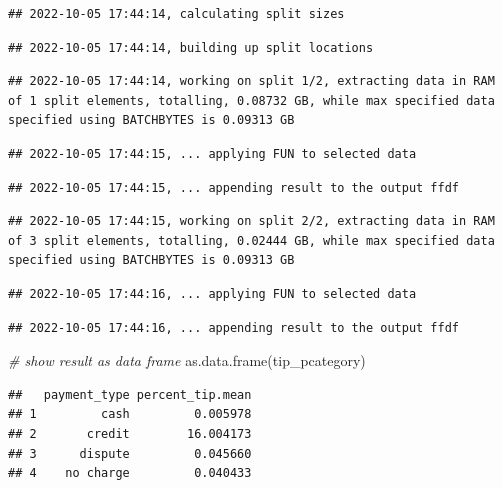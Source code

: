 \documentclass[
  12pt,
]{style/krantz}
\newenvironment{Shaded}{\begin{snugshade}}{\end{snugshade}}
\newcommand{\CommentTok}[1]{\textcolor[rgb]{0.56,0.35,0.01}{\textit{#1}}}
\newcommand{\FunctionTok}[1]{\textcolor[rgb]{0.00,0.00,0.00}{#1}}
\newcommand{\NormalTok}[1]{#1}
\begin{document}
\begin{verbatim}
## 2022-10-05 17:44:14, calculating split sizes
\end{verbatim}

\begin{verbatim}
## 2022-10-05 17:44:14, building up split locations
\end{verbatim}

\begin{verbatim}
## 2022-10-05 17:44:14, working on split 1/2, extracting data in RAM of 1 split elements, totalling, 0.08732 GB, while max specified data specified using BATCHBYTES is 0.09313 GB
\end{verbatim}

\begin{verbatim}
## 2022-10-05 17:44:15, ... applying FUN to selected data
\end{verbatim}

\begin{verbatim}
## 2022-10-05 17:44:15, ... appending result to the output ffdf
\end{verbatim}

\begin{verbatim}
## 2022-10-05 17:44:15, working on split 2/2, extracting data in RAM of 3 split elements, totalling, 0.02444 GB, while max specified data specified using BATCHBYTES is 0.09313 GB
\end{verbatim}

\begin{verbatim}
## 2022-10-05 17:44:16, ... applying FUN to selected data
\end{verbatim}

\begin{verbatim}
## 2022-10-05 17:44:16, ... appending result to the output ffdf
\end{verbatim}

\begin{Shaded}
\begin{Highlighting}[]
\CommentTok{\# show result as data frame}
\FunctionTok{as.data.frame}\NormalTok{(tip\_pcategory)}
\end{Highlighting}
\end{Shaded}

\begin{verbatim}
##   payment_type percent_tip.mean
## 1         cash         0.005978
## 2       credit        16.004173
## 3      dispute         0.045660
## 4    no charge         0.040433
\end{verbatim}
\end{document}

